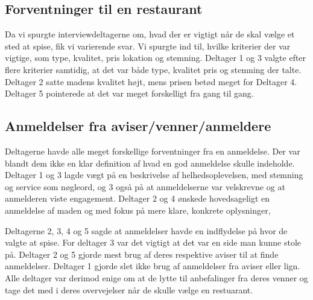 \documentclass[a4paper, 12pt]{article}
\begin{document}
\subsection{Forventninger til en restaurant}

Da vi spurgte interviewdeltagerne om, hvad der er vigtigt når de skal
vælge et sted at spise, fik vi varierende svar. Vi spurgte ind til,
hvilke kriterier der var vigtige, som type, kvalitet, pris lokation og
stemning. Deltager 1 og 3 valgte efter flere kriterier samtidig, at
det var både type, kvalitet pris og stemning der talte. Deltager 2
satte madens kvalitet højt, mens prisen betød meget for Deltager
4. Deltager 5 pointerede at det var meget forskelligt fra gang til
gang.


\subsection{Anmeldelser fra aviser/venner/anmeldere}

Deltagerne havde alle meget forskellige forventninger fra en anmeldelse. Der var blandt dem ikke en klar definition af hvad en god anmeldelse skulle indeholde. Deltager 1 og 3 lagde vægt på en beskrivelse af helhedsoplevelsen, med stemning og service som nøgleord, og 3 også på at anmeldelserne var velskrevne og at anmelderen viste engagement. Deltager 2 og 4 ønskede hovedsageligt en anmeldelse af maden og med fokus på mere klare, konkrete oplysninger,

Deltagerne 2, 3, 4 og 5 sagde at anmeldelser havde en indflydelse på hvor de valgte at spise. For deltager 3 var det vigtigt at det var en side man kunne stole på. Deltager 2 og 5 gjorde mest brug af deres respektive aviser til at finde anmeldelser. Deltager 1 gjorde slet ikke brug af anmeldelser fra aviser eller lign. Alle deltager var derimod enige om at de lytte til anbefalinger fra deres venner og tage det med i deres overvejelser når de skulle vælge en restuarant.

\end{document}
